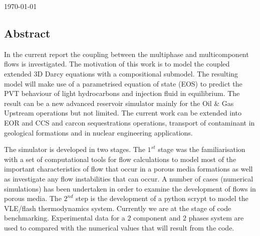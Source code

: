 \documentclass[12pt,a4paper,oneside]{report}%
\begin{document}
\begin{titlepage}


{\large \today}\\[3cm] %


\vfill %

\end{titlepage}

\begin{center}
\section*{Abstract}
\end{center}

In the current report the coupling between the multiphase and multicomponent flows is investigated. 
The motivation of this work is to model the coupled extended 3D Darcy equations with a compositional submodel. The resulting model will make use of a parametrised equation of state (EOS) to predict the PVT behaviour of light hydrocarbons and injection fluid in equilibrium. The result can be a new advanced reservoir simulator mainly for the
Oil \& Gas Upstream operations but not limited. 
The current work can be extended into EOR and CCS and carcon sequestrations operations, transport of contaminant in geological formations and in nuclear engineering applications.

The simulator is developed in two stages. The $1^{st}$ stage was the familiarisation with a set of computational tools for flow calculations to model most of the important characteristics of flow that occur in a porous media formations as well as investigate any flow instabilities that can occur. A number of cases (numerical simulations) has been undertaken in order to examine the development of flows in porous media. The $2^{nd}$ step is the development of a python scrypt to model the VLE/flash thermodynamics system. Currently we are at the stage of  code benchmarking. Experimental data for a $2$ component and $2$ phases system are used to compared with the numerical values that will result from the code.  
\end{document}
